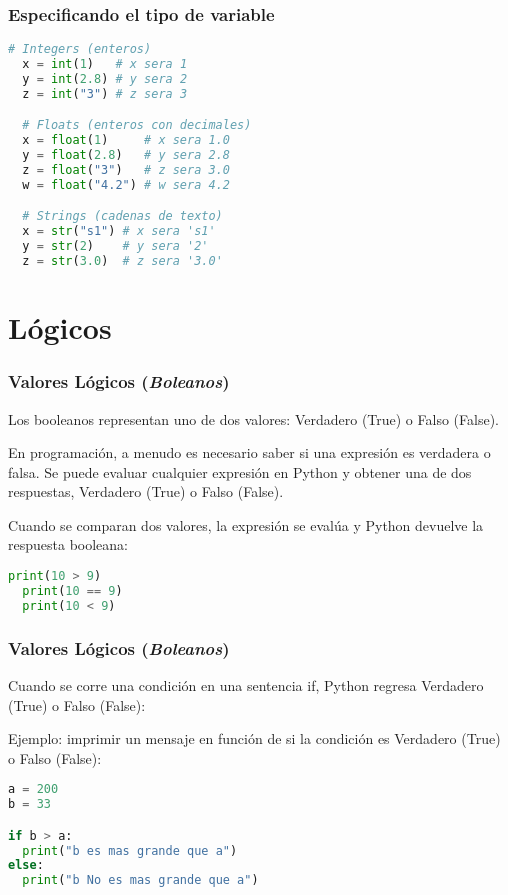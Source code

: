 \begin{frame}[fragile]
  \frametitle{Especificando el tipo de variable}
  \begin{lstlisting}[language=Python]
  # Integers (enteros)
  x = int(1)   # x sera 1
  y = int(2.8) # y sera 2
  z = int("3") # z sera 3

  # Floats (enteros con decimales)
  x = float(1)     # x sera 1.0
  y = float(2.8)   # y sera 2.8
  z = float("3")   # z sera 3.0
  w = float("4.2") # w sera 4.2

  # Strings (cadenas de texto)
  x = str("s1") # x sera 's1'
  y = str(2)    # y sera '2'
  z = str(3.0)  # z sera '3.0'
  \end{lstlisting}
\end{frame}

\section{Lógicos}

\begin{frame}[fragile]
  \frametitle{Valores Lógicos (\emph{Boleanos})}
  Los booleanos representan uno de dos valores: Verdadero
  (\textcolor{codeKeyword2}{True}) o Falso
  (\textcolor{codeKeyword2}{False}).

  \vspace{\baselineskip}
  En programación, a menudo es necesario saber si una expresión es verdadera
  o falsa. Se puede evaluar cualquier expresión en Python y obtener una de
  dos respuestas, Verdadero (\textcolor{codeKeyword2}{True})
  o Falso (\textcolor{codeKeyword2}{False}).

  \vspace{\baselineskip}
  Cuando se comparan dos valores, la expresión se evalúa y Python
  devuelve la respuesta booleana: 

  \begin{lstlisting}[language=Python]
  print(10 > 9)
  print(10 == 9)
  print(10 < 9)
  \end{lstlisting}
\end{frame}

\begin{frame}[fragile]
  \frametitle{Valores Lógicos (\emph{Boleanos})}

  Cuando se corre una condición en una sentencia
  \textcolor{codeKeyword}{if}, Python regresa Verdadero
  (\textcolor{codeKeyword2}{True}) o Falso
  (\textcolor{codeKeyword2}{False}):

  \vspace{\baselineskip}
  Ejemplo: imprimir un mensaje en función de si la condición es Verdadero
  (\textcolor{codeKeyword2}{True}) o Falso
  (\textcolor{codeKeyword2}{False}):
  \begin{lstlisting}[language=Python]
a = 200
b = 33

if b > a:
  print("b es mas grande que a")
else:
  print("b No es mas grande que a") 
  \end{lstlisting}
\end{frame}

